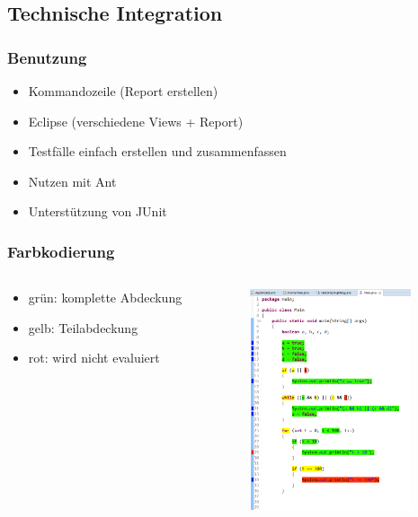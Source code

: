 \documentclass{beamer}
\begin{document}
  \subsection{Technische Integration}
  \begin{frame}\frametitle{Benutzung}
    \begin{itemize}
      \item Kommandozeile (Report erstellen)
      \item Eclipse (verschiedene Views + Report)
      \item Testfälle einfach erstellen und zusammenfassen
      \item Nutzen mit Ant
      \item Unterstützung von JUnit
    \end{itemize}
  \end{frame}

  \begin{frame}\frametitle{Farbkodierung}
    \begin{columns}
      \begin{column}{5cm}
        \begin{itemize}
          \item grün: komplette Abdeckung
          \item gelb: Teilabdeckung
          \item rot: wird nicht evaluiert
        \end{itemize}
        \vspace{1cm}
      \end{column}
      \begin{column}{5cm}
        \begin{overprint}
          \includegraphics[height=65mm]{pictures/farben.png}
        \end{overprint}
      \end{column}
    \end{columns}
  \end{frame}
\end{document}
